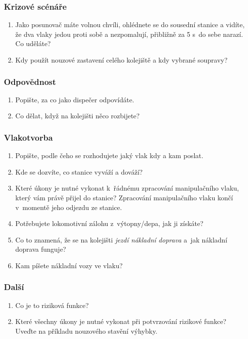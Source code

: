 \documentclass[12pt,a4paper]{article}
\begin{document}
\subsubsection*{Krizové scénáře}
\begin{enumerate}[leftmargin=*]
\item Jako posunovač máte volnou chvíli, ohlédnete se do sousední stanice a
vidíte, že dva vlaky jedou proti sobě a nezpomalují, přibližně za 5 s~do sebe
narazí. Co uděláte?
\item Kdy použít nouzové zastavení celého kolejiště a kdy vybrané soupravy?
\end{enumerate}

\subsubsection*{Odpovědnost}
\begin{enumerate}[leftmargin=*]
\item Popište, za co jako dispečer odpovídáte.
\item Co dělat, když na kolejišti něco rozbijete?
\end{enumerate}

\subsubsection*{Vlakotvorba}
\begin{enumerate}[leftmargin=*]
\item Popište, podle čeho se rozhodujete jaký vlak kdy a kam poslat.
\item Kde se dozvíte, co stanice vyváží a dováží?
\item Které úkony je nutné vykonat k~řádnému zpracování manipulačního vlaku,
který vám právě přijel do stanice? Zpracování manipulačního vlaku končí
v~momentě jeho odjezdu ze stanice.
\item Potřebujete lokomotivní zálohu z~výtopny/depa, jak ji získáte?
\item Co to znamená, že se na kolejišti \textit{jezdí nákladní doprava} a~jak
nákladní doprava funguje?
\item Kam píšete nákladní vozy ve vlaku?
\end{enumerate}

\subsubsection*{Další}
\begin{enumerate}[leftmargin=*]
\item Co je to riziková funkce?
\item Které všechny úkony je nutné vykonat při potvrzování rizikové funkce?
Uveďte na příkladu nouzového stavění výhybky.
\end{enumerate}
\end{document}
